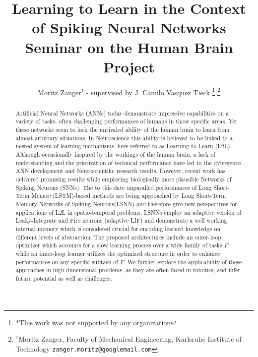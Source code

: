 \documentclass[letterpaper, 10 pt, conference]{ieeeconf}  %
\title{\LARGE \bf
Learning to Learn in the Context of Spiking Neural Networks \newline
Seminar on the Human Brain Project
}
\author{Moritz Zanger$^{1}$ - supervised by J. Camilo Vasquez Tieck  %
\thanks{*This work was not supported by any organization}%
\thanks{$^{1}$Moritz Zanger, Faculty of Mechanical Engineering, Karlsruhe Institute of Technology
        {\tt\small zanger.moritz@googlemail.com}}%
}
\begin{document}
\maketitle
\thispagestyle{empty}
\pagestyle{empty}


\begin{abstract}
Artificial Neural Networks (ANNs) today demonstrate impressive capabilities on a variety of tasks, often challenging performances of humans in 
those specific areas. Yet these networks seem to lack the unrivaled ability of the human brain to learn from almost arbitrary 
situations. In Neuroscience this ability is believed to be linked to a nested system of learning mechanisms, here referred to as 
Learning to Learn (L2L). Although occasionally inspired by the workings of the human brain, a lack of understanding and the priorization 
of technical performance have led to the dviergence ANN development and Neuroscientific research results. However, recent
work has delivered promising results while employing biologically more plausible Networks of Spiking Neurons (SNNs). The to this date 
unparalled performances of Long Short-Term Memory(LSTM)-based methods are being approached by Long Short-Term Memory Networks of Spiking
Neurons(LSNN) and therefore give new perspectives for applications of L2L in spatio-temporal problems. LSNNs employ an adaptive version of Leaky-Integrate
and Fire neurons (adaptive LIF) and demonstrate a well working internal memory which is considered crucial for encoding learned knowledge
on different levels of abstraction. The proposed architectures include an outer-loop optimizer which accounts for a slow learning 
process over a wide family of tasks $F$, while an inner-loop learner utilizes the optimized structure in order to enhance performances on 
any specific subtask of $F$. We further explore the applicability of these approaches in high-dimensional problems, as they are often 
faced in robotics, and infer future potential as well as challenges.
\end{abstract}

\end{document}
